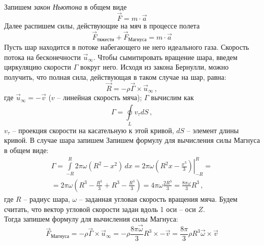 \documentclass[a5paper, 10pt]{article}
\theoremstyle{definition}
\theoremstyle{plain}
\theoremstyle{remark}
\begin{document}
Запишем \textit{закон Ньютона} в общем виде
\begin{equation}
\vec{F} = m \cdot \vec{a}
\end{equation}
Далее распишем силы, действующие на мяч в процессе полета
\begin{equation}
\vec{F}_{\text{тяжести}} + \vec{F}_{\text{Магнуса}}= m \cdot \vec{a}
\end{equation}
Пусть шар находится в потоке набегающего не него идеального газа. Скорость потока на бесконечности $\vec{u}_\infty$. Чтобы сымитировать вращение шара, введем циркуляцию скорости $\Gamma$ вокруг него. Исходя из закона Бернулли, можно получить, что полная сила, действующая в таком случае на шар, равна:
\begin{equation}
\vec{R}= - \rho \vec{\Gamma} \times \vec{u}_\infty \, ,
\end{equation}
где $ \vec{u}_\infty = -\vec{v}$ ($v$ -- линейная скорость мяча);  $\Gamma$ вычислим как
\begin{equation}
\Gamma = \oint \limits^{}_L v_\tau dS \, ,
\end{equation}
$ v_\tau$ -- проекция скорости на касательную к этой кривой, $dS$ -- элемент длины кривой. В случае шара запишем
Запишем формулу для вычисления силы Магнуса в общем виде:
\begin{multline}
\Gamma = \int \limits^R_{-R} 2 \pi \omega (R^2 - x^2) \, dx = 2 \pi \omega \left. \left( R^2x - \frac{x^3}{3}\right)\right|^R_{-R} =\\
=  2 \pi \omega  \left( R^3 - \frac{R^3}{3} +  R^3 - \frac{R^3}{3} \right) = 4 \pi \omega \frac{2 R^3 }{3} = \frac{8 \pi \omega}{3}  R^3  \, ,
\end{multline}
где $R$ -- радиус шара, $\omega$ -- заданная угловая скорость вращения мяча. Будем считать, что вектор угловой скорости задан вдоль 1 оси -- оси $Z$.\\
Тогда запишем формулу для вычисления силы Магнуса:
\begin{equation}
\vec{F}_{\text{Магнуса}} = - \rho \vec{\Gamma} \times \vec{u}_\infty = - \rho  \frac{8 \pi \vec{\omega} }{3}  R^3  \times -\vec{v} = \frac{8 \pi }{3} \rho R^3 \vec{\omega} \times \vec{v}  
\end{equation}
\end{document}
